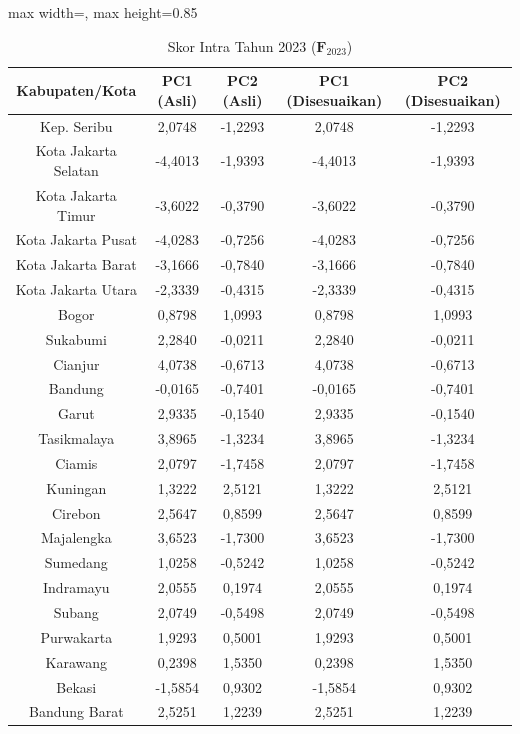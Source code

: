 \begin{table}[H]
\centering
\caption{Skor Intra Tahun 2023 ($\mathbf{F}_{2023}$)} \label{tab:app2skor_intra_2023}
\begin{adjustbox}{max width=\textwidth, max height=0.85\textheight}
\begin{tabular}{|c|c|c|c|c|}
\hline
\textbf{Kabupaten/Kota} & \textbf{PC1 (Asli)} & \textbf{PC2 (Asli)} & \textbf{PC1 (Disesuaikan)} & \textbf{PC2 (Disesuaikan)} \\
\hline
Kep. Seribu & 2,0748 & -1,2293 & 2,0748 & -1,2293 \\
Kota Jakarta Selatan & -4,4013 & -1,9393 & -4,4013 & -1,9393 \\
Kota Jakarta Timur & -3,6022 & -0,3790 & -3,6022 & -0,3790 \\
Kota Jakarta Pusat & -4,0283 & -0,7256 & -4,0283 & -0,7256 \\
Kota Jakarta Barat & -3,1666 & -0,7840 & -3,1666 & -0,7840 \\
Kota Jakarta Utara & -2,3339 & -0,4315 & -2,3339 & -0,4315 \\
Bogor & 0,8798 & 1,0993 & 0,8798 & 1,0993 \\
Sukabumi & 2,2840 & -0,0211 & 2,2840 & -0,0211 \\
Cianjur & 4,0738 & -0,6713 & 4,0738 & -0,6713 \\
Bandung & -0,0165 & -0,7401 & -0,0165 & -0,7401 \\
Garut & 2,9335 & -0,1540 & 2,9335 & -0,1540 \\
Tasikmalaya & 3,8965 & -1,3234 & 3,8965 & -1,3234 \\
Ciamis & 2,0797 & -1,7458 & 2,0797 & -1,7458 \\
Kuningan & 1,3222 & 2,5121 & 1,3222 & 2,5121 \\
Cirebon & 2,5647 & 0,8599 & 2,5647 & 0,8599 \\
Majalengka & 3,6523 & -1,7300 & 3,6523 & -1,7300 \\
Sumedang & 1,0258 & -0,5242 & 1,0258 & -0,5242 \\
Indramayu & 2,0555 & 0,1974 & 2,0555 & 0,1974 \\
Subang & 2,0749 & -0,5498 & 2,0749 & -0,5498 \\
Purwakarta & 1,9293 & 0,5001 & 1,9293 & 0,5001 \\
Karawang & 0,2398 & 1,5350 & 0,2398 & 1,5350 \\
Bekasi & -1,5854 & 0,9302 & -1,5854 & 0,9302 \\
Bandung Barat & 2,5251 & 1,2239 & 2,5251 & 1,2239 \\

\end{tabular}
\end{adjustbox}
\end{table}
